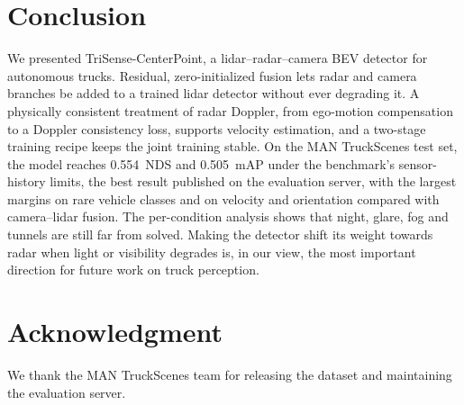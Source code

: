 \documentclass[conference]{IEEEtran}
\newcommand{\method}{TriSense-CenterPoint}
\begin{document}
\section{Conclusion}

We presented \method, a lidar--radar--camera BEV detector for autonomous trucks. Residual, zero-initialized fusion
lets radar and camera branches be added to a trained lidar detector without ever degrading it. A physically
consistent treatment of radar Doppler, from ego-motion compensation to a Doppler consistency loss, supports
velocity estimation, and a two-stage training recipe keeps the joint training stable. On the MAN TruckScenes test set,
the model reaches 0.554~NDS and 0.505~mAP under the benchmark's sensor-history limits, the best result published on the
evaluation server, with the largest margins on rare vehicle classes and on velocity and orientation compared with
camera--lidar fusion. The per-condition analysis
shows that night, glare, fog and tunnels are still far from solved. Making the detector shift its weight towards
radar when light or visibility degrades is, in our view, the most important direction for future work on truck
perception.

\section*{Acknowledgment}
We thank the MAN TruckScenes team for releasing the dataset and maintaining the evaluation server.



\end{document}
